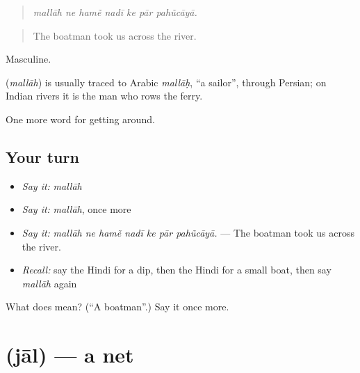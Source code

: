 \begin{quote}
      
\end{quote}

\begin{quote}
\emph{mallāh ne hamẽ nadī ke pār pahũcāyā.}
\end{quote}

\begin{quote}
The boatman took us across the river.
\end{quote}

Masculine.

\begin{cousinweb}
\textbf{} (\emph{mallāh}) is usually traced to Arabic \emph{mallāḥ}, \textquotedblleft{}a sailor\textquotedblright{}, through Persian; on Indian rivers it is the man who rows the ferry.
\end{cousinweb}

\begin{grammarlens}[title={What you've built}]
One more word for getting around.
\end{grammarlens}

\subsection*{Your turn}
\begin{itemize}
\raggedright
  \item \emph{Say it:} \emph{mallāh}
  \item \emph{Say it:} \emph{mallāh}, once more
  \item \emph{Say it:} \emph{mallāh ne hamẽ nadī ke pār pahũcāyā.} — The boatman took us across the river.
  \item \emph{Recall:} say the Hindi for a dip, then the Hindi for a small boat, then say \emph{mallāh} again
\end{itemize}

\begin{tcolorbox}[breakable,colback=teal!4,colframe=teal!35!black,title={Before you move on}]
What does  mean? (\textquotedblleft{}A boatman\textquotedblright{}.) Say it once more.
\end{tcolorbox}
\section[\texorpdfstring{\hi{जाल} (jāl)}{जाल (jāl)}]{ (jāl) — a net}

\label{lesson:HI-C445-jal}



